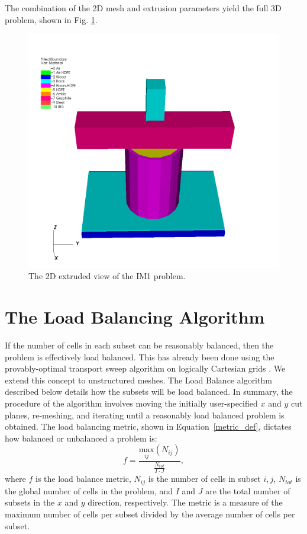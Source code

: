 \documentclass{anstrans}
\begin{document}
The combination of the 2D mesh and extrusion parameters yield the full 3D problem, shown in Fig. \ref{IM13D}.

\begin{figure}[H]
\centering
\includegraphics[scale = 0.3]{figures/IM1_3D.png}
\caption{The 2D extruded view of the IM1 problem.}
\label{IM13D}
\end{figure}


\section{The Load Balancing Algorithm}

If the number of cells in each subset can be reasonably balanced, then the problem is effectively load balanced. This has already been done using  the provably-optimal transport sweep algorithm on logically Cartesian grids \cite{mpadams2015}.  We extend this concept to unstructured meshes. The Load Balance algorithm described below details how the subsets will be load balanced. In summary, the procedure of the algorithm involves moving the initially user-specified $x$ and $y$ cut planes, re-meshing, and iterating until a reasonably load balanced problem is obtained.  The load balancing metric, shown in Equation~\eqref{metric_def}, dictates how balanced or unbalanced a problem is:
\begin{equation}
f =\frac{\underset{ij}{\text{max}}(N_{ij})}{\frac{N_{tot}}{I\cdot J}},
\label{metric_def}
\end{equation}
where $f$ is the load balance metric, $N_{ij}$ is the number of cells in subset $i,j$, $N_{tot}$ is the global number of cells in the problem, and $I$ and $J$ are the total number of subsets in the $x$ and $y$ direction, respectively. The metric is a measure of the maximum number of cells per subset divided by the average number of cells per subset.
\end{document}
